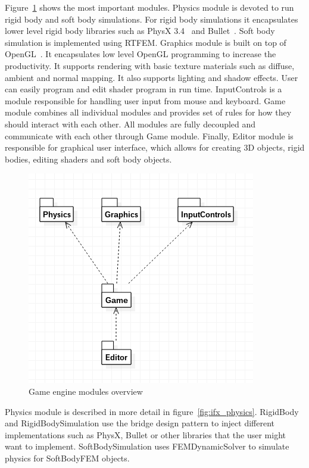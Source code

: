 \documentclass[en]{minipw} %
\begin{document}
Figure~\ref{fig:ifx_general} shows the most important modules. Physics module is devoted to run rigid body and soft body simulations. For rigid body simulations it encapsulates lower level rigid body libraries such as PhysX 3.4~\cite{physx} and Bullet~\cite{bullet}. Soft body simulation is implemented using RTFEM.
Graphics module is built on top of OpenGL~\cite{opengl}. It encapsulates low level OpenGL programming to increase the productivity. It supports rendering with basic texture materials such as diffuse, ambient and normal mapping. It also supports lighting and shadow effects. User can easily program and edit shader program in run time.
InputControls is a module responsible for handling user input from mouse and keyboard.
Game module combines all individual modules and provides set of rules for how they should interact with each other. All modules are fully decoupled and communicate with each other through Game module.
Finally, Editor module is responsible for graphical user interface, which allows for creating 3D objects, rigid bodies, editing shaders and soft body objects.

\begin{figure}[h!]
\centering
\includegraphics[scale=0.5]{pictures/ifx_general.png}
\caption[Game engine modules overview]{Game engine modules overview}
\label{fig:ifx_general}
\end{figure}

Physics module is described in more detail in figure~\ref{fig:ifx_physics}. RigidBody and RigidBodySimulation use the bridge design pattern to inject different implementations such as PhysX, Bullet or other libraries that the user might want to implement. SoftBodySimulation uses FEMDynamicSolver to simulate physics for SoftBodyFEM objects.
\end{document}
